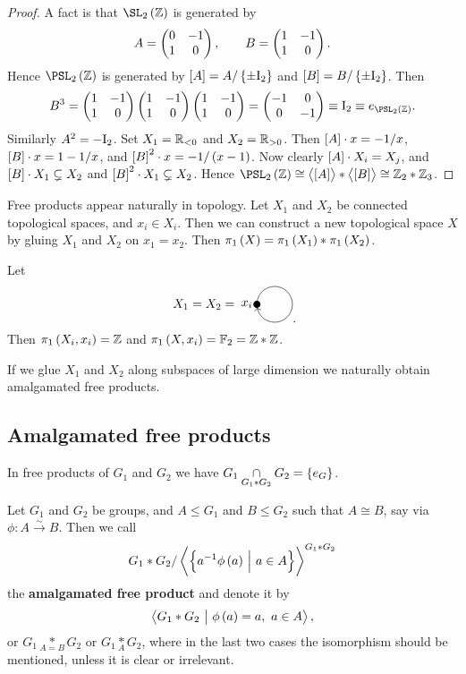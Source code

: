 
\begin{proof}
A fact is that $ \SL_2\br{\ZZ} $ is generated by
$$ A = \begin{pmatrix} 0 & -1 \\ 1 & 0 \end{pmatrix}, \qquad B = \begin{pmatrix} 1 & -1 \\ 1 & 0 \end{pmatrix}. $$
Hence $ \PSL_2\br{\ZZ} $ is generated by $ \sbr{A} = A / \cbr{\pm\I_2} $ and $ \sbr{B} = B / \cbr{\pm\I_2} $. Then
$$ B^3 = \twobytwo{1}{-1}{1}{0}\twobytwo{1}{-1}{1}{0}\twobytwo{1}{-1}{1}{0} = \twobytwo{-1}{0}{0}{-1} \equiv \I_2 \equiv e_{\PSL_2\br{\ZZ}}. $$
Similarly $ A^2 = -\mathrm{I}_2 $. Set $ X_1 = \mathbb{R}_{< 0} $ and $ X_2 = \mathbb{R}_{> 0} $. Then $ \sbr{A} \cdot x = -1 / x $, $ \sbr{B} \cdot x = 1 - 1 / x $, and $ \sbr{B}^2 \cdot x = -1 / \br{x - 1} $. Now clearly $ \sbr{A} \cdot X_i = X_j $, and $ \sbr{B} \cdot X_1 \subsetneq X_2 $ and $ \sbr{B}^2 \cdot X_1 \subsetneq X_2 $. Hence $ \PSL_2\br{\ZZ} \cong \abr{\sbr{A}} * \abr{\sbr{B}} \cong \ZZ_2 * \ZZ_3 $.
\end{proof}

\begin{remark*}
Free products appear naturally in topology. Let $ X_1 $ and $ X_2 $ be connected topological spaces, and $ x_i \in X_i $. Then we can construct a new topological space $ X $ by gluing $ X_1 $ and $ X_2 $ on $ x_1 = x_2 $. Then $ \pi_1\br{X} = \pi_1\br{X_1} * \pi_1\br{X_2} $.
\end{remark*}

\begin{example*}
Let
$$
\begin{tikzpicture}
\draw (-0.5, 0) node[left]{$ X_1 = X_2 = $};
\fill (0, 0) circle (0.1) node[left]{$ x_i $};
\draw [->] (0, 0) arc (180:-170:0.5);
\end{tikzpicture}.
$$
Then $ \pi_1\br{X_i, x_i} = \ZZ $ and $ \pi_1\br{X, x_i} = \FF_2 = \ZZ * \ZZ $.
\end{example*}

If we glue $ X_1 $ and $ X_2 $ along subspaces of large dimension we naturally obtain amalgamated free products.

\subsection{Amalgamated free products}

In free products of $ G_1 $ and $ G_2 $ we have $ G_1 \underset{G_1 * G_2}{\cap} G_2 = \cbr{e_G} $.

\begin{definition}
Let $ G_1 $ and $ G_2 $ be groups, and $ A \le G_1 $ and $ B \le G_2 $ such that $ A \cong B $, say via $ \phi : A \xrightarrow{\sim} B $. Then we call
$$ G_1 * G_2 / \abr{\cbr{a^{-1}\phi\br{a} \st a \in A}}^{G_1 * G_2} $$
the \textbf{amalgamated free product} and denote it by
$$ \abr{G_1 * G_2 \st \phi\br{a} = a, \ a \in A}, $$
or $ G_1 \underset{A = B}{*} G_2 $ or $ G_1 \underset{A}{*} G_2 $, where in the last two cases the isomorphism should be mentioned, unless it is clear or irrelevant.
\end{definition}

